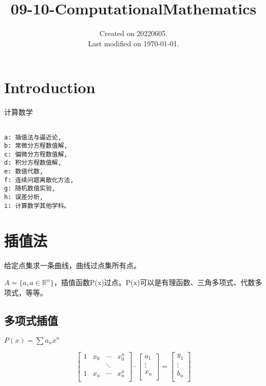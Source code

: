 \documentclass[UTF8]{../09-Mathematics}
\begin{document}
\title{09-10-ComputationalMathematics}
\date{Created on 20220605.\\   Last modified on \today.}
\maketitle
\tableofcontents


\chapter{Introduction}
计算数学

\begin{lstlisting}
  
a: 插值法与逼近论, 
b: 常微分方程数值解, 
c: 偏微分方程数值解, 
d: 积分方程数值解, 
e: 数值代数, 
f: 连续问题离散化方法, 
g: 随机数值实验, 
h: 误差分析, 
i: 计算数学其他学科。

\end{lstlisting}


\chapter{插值法}
给定点集求一条曲线，曲线过点集所有点。

$A = \{a, a\in \mathbb R^n\}$，插值函数P(x)过点。P(x)可以是有理函数、三角多项式、代数多项式，等等。

\section{多项式插值}
$P(x) = \sum a_n x^n$

\begin{equation}
    \begin{bmatrix}
       1 & x_0 & \cdots & x_0^n\\
       & & \ddots & \\
       1 & x_n & \cdots & x_n^n\\
    \end{bmatrix}
    \cdot
    \begin{bmatrix}
      a_1 \\
      \vdots \\
      x_n \\
    \end{bmatrix}
    =
    \begin{bmatrix}
      y_1 \\
      \vdots \\
      b_n \\
    \end{bmatrix}
\end{equation}
\end{document}
